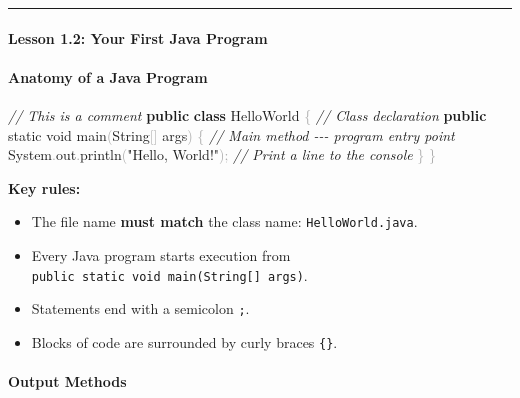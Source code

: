 \documentclass[
  justified,
  openright,
]{tufte-book}
\let\subsection\paragraph
\let\paragraph\paragraph
\newcommand{\KeywordTok}[1]{\textcolor{CodeKeyword}{\textbf{#1}}}  %
\newcommand{\StringTok}[1]{\textcolor{CodeString}{#1}}              %
\newcommand{\CommentTok}[1]{\textcolor{CodeComment}{\textit{#1}}}  %
\newcommand{\CodeFuncTok}[1]{\textcolor{CodeKeyword}{#1}}           %
\newcommand{\CodeTypeTok}[1]{\textcolor{CodeType}{#1}}              %
\newcommand{\OperatorTok}[1]{\textcolor{DarkGray}{#1}}              %
\newenvironment{Shaded}{%
  \begin{mdframed}[style=TufteCode]%
}{%
  \end{mdframed}%
}
\let\subsection\paragraph
\let\paragraph\paragraph
\providecommand{\tightlist}{%
  \setlength{\itemsep}{0pt}\setlength{\parskip}{0pt}}
\begin{document}
\begin{center}\rule{0.5\linewidth}{0.5pt}\end{center}

\subsection{Lesson 1.2: Your First Java
Program}\label{lesson-1.2-your-first-java-program-1}

\subsection{Anatomy of a Java
Program}\label{anatomy-of-a-java-program}

\begin{Shaded}
\begin{Highlighting}[]
\CommentTok{// This is a comment}
\KeywordTok{public} \KeywordTok{class} HelloWorld \OperatorTok{\{}                    \CommentTok{// Class declaration}
    \KeywordTok{public} \CodeTypeTok{static} \CodeTypeTok{void} \CodeFuncTok{main}\OperatorTok{(}String\OperatorTok{[]} args\OperatorTok{)} \OperatorTok{\{} \CommentTok{// Main method {-}{-}{-} program entry point}
        System\OperatorTok{.}\CodeFuncTok{out}\OperatorTok{.}\CodeFuncTok{println}\OperatorTok{(}\StringTok{"Hello, World!"}\OperatorTok{);} \CommentTok{// Print a line to the console}
    \OperatorTok{\}}
\OperatorTok{\}}
\end{Highlighting}
\end{Shaded}

\textbf{Key rules:}

\begin{itemize}
\tightlist
\item
  The file name \textbf{must match} the class name:
  \texttt{HelloWorld.java}.
\item
  Every Java program starts execution from
  \texttt{public\ static\ void\ main(String{[}{]}\ args)}.
\item
  Statements end with a semicolon \texttt{;}.
\item
  Blocks of code are surrounded by curly braces \texttt{\{\}}.
\end{itemize}

\subsection{Output Methods}\label{output-methods}
\end{document}
